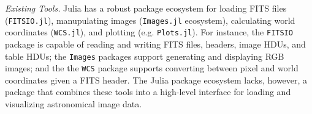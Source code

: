\documentclass{juliacon}
\begin{document}

\vspace{0.2cm}
\emph{Existing Tools.}
Julia has a robust package ecosystem for loading FITS files (\verb|FITSIO.jl|), manupulating images (\verb|Images.jl| ecosystem), calculating world coordinates (\verb|WCS.jl|), and plotting (e.g. \verb|Plots.jl|).
For instance, the \verb|FITSIO| package is capable of reading and writing FITS files, headers, image HDUs, and table HDUs;
the \verb|Images| packages support generating and displaying RGB images; 
and the the \verb|WCS| package supports converting between pixel and world coordinates given a FITS header.
The Julia package ecosystem lacks, however, a package that combines these tools into a high-level interface for loading and visualizing astronomical image data.
\end{document}
